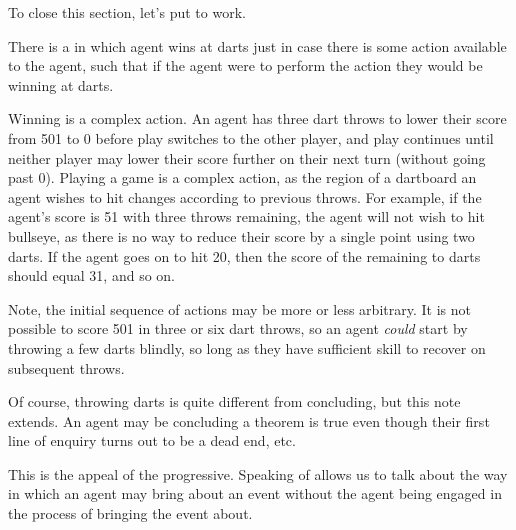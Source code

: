 \begin{note}
  To close this section, let's put  to work.

  \begin{illustration}[Darts]
    There is a \pevent{} in which agent wins at darts just in case there is some action available to the agent, such that if the agent were to perform the action they would be winning at darts.

    Winning is a complex action.
  An agent has three dart throws to lower their score from 501 to 0 before play switches to the other player, and play continues until neither player may lower their score further on their next turn (without going past 0).
  Playing a game is a complex action, as the region of a dartboard an agent wishes to hit changes according to previous throws.
  For example, if the agent's score is 51 with three throws remaining, the agent will not wish to hit bullseye, as there is no way to reduce their score by a single point using two darts.
  If the agent goes on to hit 20, then the score of the remaining to darts should equal 31, and so on.
  \end{illustration}

  Note, the initial sequence of actions may be more or less arbitrary.
  It is not possible to score 501 in three or six dart throws, so an agent \emph{could} start by throwing a few darts blindly, so long as they have sufficient skill to recover on subsequent throws.

  Of course, throwing darts is quite different from concluding, but this note extends.
  An agent may be concluding a theorem is true even though their first line of enquiry turns out to be a dead end, etc.

  This is the appeal of the progressive.
  Speaking of  allows us to talk about the way in which an agent may bring about an event without the agent being engaged in the process of bringing the event about.
\end{note}


\section{}
\label{cha:fcs:def}

